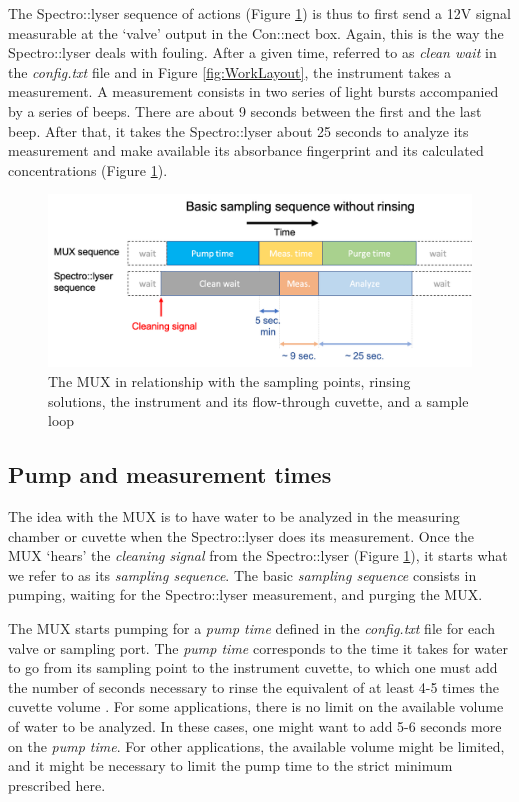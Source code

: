 \documentclass[]{book}
\begin{document}
The Spectro::lyser sequence of actions (Figure \ref{fig:BasicSequence}) is thus to first send a 12V signal measurable at the `valve' output in the Con::nect box. Again, this is the way the Spectro::lyser deals with fouling. After a given time, referred to as \emph{clean wait} in the \emph{config.txt} file and in Figure \ref{fig:WorkLayout}, the instrument takes a measurement. A measurement consists in two series of light bursts accompanied by a series of beeps. There are about 9 seconds between the first and the last beep. After that, it takes the Spectro::lyser about 25 seconds to analyze its measurement and make available its absorbance fingerprint and its calculated concentrations (Figure \ref{fig:BasicSequence}).

\begin{figure}

{\centering \includegraphics[width=0.8\linewidth]{pictures/BasicSequence} 

}

\caption{The MUX in relationship with the sampling points, rinsing solutions, the instrument and its flow-through cuvette, and a sample loop}\label{fig:BasicSequence}
\end{figure}

\hypertarget{pump-and-measurement-times}{%
\subsection{Pump and measurement times}\label{pump-and-measurement-times}}

The idea with the MUX is to have water to be analyzed in the measuring chamber or cuvette when the Spectro::lyser does its measurement. Once the MUX `hears' the \emph{cleaning signal} from the Spectro::lyser (Figure \ref{fig:BasicSequence}), it starts what we refer to as its \emph{sampling sequence}. The basic \emph{sampling sequence} consists in pumping, waiting for the Spectro::lyser measurement, and purging the MUX.

The MUX starts pumping for a \emph{pump time} defined in the \emph{config.txt} file for each valve or sampling port. The \emph{pump time} corresponds to the time it takes for water to go from its sampling point to the instrument cuvette, to which one must add the number of seconds necessary to rinse the equivalent of at least 4-5 times the cuvette volume \citep{Birgand2016-to}. For some applications, there is no limit on the available volume of water to be analyzed. In these cases, one might want to add 5-6 seconds more on the \emph{pump time}. For other applications, the available volume might be limited, and it might be necessary to limit the pump time to the strict minimum prescribed here.
\end{document}
